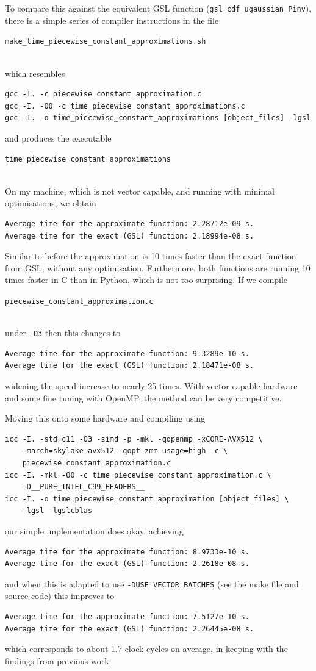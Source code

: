 \documentclass[11pt,a4paper,twoside,english]{extarticle}
\newcommand{\singlecodeline}[1]{\\[1em]\centerline{\lstinline[basicstyle=\ttfamily]$#1$}\\[1em]}
\begin{document}
To compare this against the equivalent GSL function (\verb|gsl_cdf_ugaussian_Pinv|), there is a simple series of compiler instructions in the file \singlecodeline{make_time_piecewise_constant_approximations.sh} which resembles 
\begin{verbatim}
gcc -I. -c piecewise_constant_approximation.c
gcc -I. -O0 -c time_piecewise_constant_approximations.c
gcc -I. -o time_piecewise_constant_approximations [object_files] -lgsl
\end{verbatim}
and produces the executable \singlecodeline{time_piecewise_constant_approximations}

On my machine, which is not vector capable, and running with minimal optimisations, we obtain
\begin{verbatim}
Average time for the approximate function: 2.28712e-09 s.
Average time for the exact (GSL) function: 2.18994e-08 s.
\end{verbatim}
Similar to before the approximation is 10 times faster than the exact function from GSL, without any optimisation. Furthermore, both functions are running 10 times faster in C than in Python, which is not too surprising. If we compile \singlecodeline{piecewise_constant_approximation.c}
under \verb|-O3| then this changes to 
\begin{verbatim}
Average time for the approximate function: 9.3289e-10 s.
Average time for the exact (GSL) function: 2.18471e-08 s.
\end{verbatim}
widening the speed increase to nearly 25 times. With vector capable hardware and some fine tuning with OpenMP, the method can be very competitive. 


Moving this onto some \intel hardware and compiling using 
\begin{verbatim}
icc -I. -std=c11 -O3 -simd -p -mkl -qopenmp -xCORE-AVX512 \
    -march=skylake-avx512 -qopt-zmm-usage=high -c \
    piecewise_constant_approximation.c 
icc -I. -mkl -O0 -c time_piecewise_constant_approximation.c \
    -D__PURE_INTEL_C99_HEADERS__
icc -I. -o time_piecewise_constant_approximation [object_files] \
    -lgsl -lgslcblas
\end{verbatim}
our simple implementation does okay, achieving
\begin{verbatim}
Average time for the approximate function: 8.9733e-10 s.
Average time for the exact (GSL) function: 2.2618e-08 s.
\end{verbatim}
and when this is adapted to use \verb|-DUSE_VECTOR_BATCHES| (see the make file and source code) this improves to
\begin{verbatim}
Average time for the approximate function: 7.5127e-10 s.
Average time for the exact (GSL) function: 2.26445e-08 s.
\end{verbatim}
which corresponds to about 1.7 clock-cycles on average, in keeping with the findings from previous work. 
\end{document}
